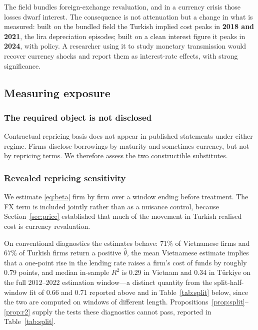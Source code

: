 \documentclass[review,12pt,authoryear]{elsarticle}
\theoremstyle{plain}
\theoremstyle{definition}
\begin{document}
The field bundles foreign-exchange revaluation, and in a currency crisis those
losses dwarf interest. The consequence is not attenuation but a change in what
is measured: built on the bundled field the Turkish implied cost peaks in
\textbf{2018 and 2021}, the lira depreciation episodes; built on a clean
interest figure it peaks in \textbf{2024}, with policy. A researcher using it to
study monetary transmission would recover currency shocks and report them as
interest-rate effects, with strong significance.

\subsection{Measuring exposure}
\label{sec:exposure}


\subsubsection{The required object is not disclosed}

Contractual repricing basis does not appear in published statements under either
regime. Firms disclose borrowings by maturity and sometimes currency, but not by
repricing terms. We therefore assess the two constructible substitutes.

\subsubsection{Revealed repricing sensitivity}

We estimate \eqref{eq:beta} firm by firm over a window ending before treatment.
The FX term is included jointly rather than as a nuisance control, because
Section~\ref{sec:price} established that much of the movement in Turkish
realised cost is currency revaluation.

On conventional diagnostics the estimates behave: 71\% of Vietnamese firms and
67\% of Turkish firms return a positive $\widehat{\theta}$, the mean Vietnamese
estimate implies that a one-point rise in the lending rate raises a firm's cost
of funds by roughly 0.79 points, and median in-sample $R^2$ is 0.29 in Vietnam
and 0.34 in T\"{u}rkiye on the full 2012--2022 estimation window---a distinct
quantity from the split-half-window fit of 0.66 and 0.71 reported above and
in Table~\ref{tab:split} below, since the two are computed on windows of
different length. Propositions~\ref{prop:split}--\ref{prop:r2} supply the
tests these diagnostics cannot pass, reported in Table~\ref{tab:split}.
\end{document}
